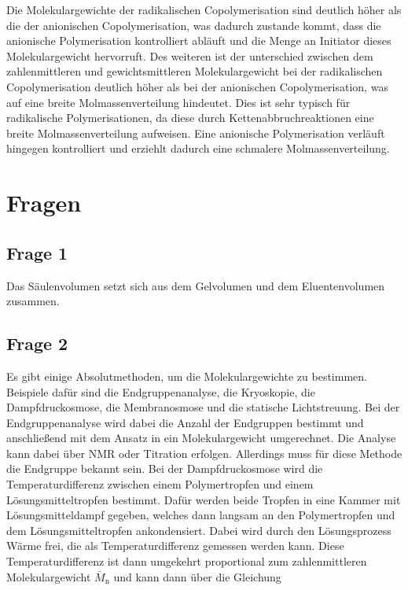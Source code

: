 \documentclass[10pt,a4paper,ngerman]{scrartcl}
\begin{document}
		Die Molekulargewichte der radikalischen Copolymerisation sind deutlich höher als die der anionischen Copolymerisation, was dadurch 
		zustande kommt, dass die anionische Polymerisation kontrolliert abläuft und die Menge an Initiator dieses Molekulargewicht hervorruft. 
		Des weiteren ist der unterschied zwischen dem zahlenmittleren und gewichtsmittleren Molekulargewicht bei der radikalischen 
		Copolymerisation deutlich höher als bei der anionischen Copolymerisation, was auf eine breite Molmassenverteilung hindeutet. Dies ist sehr 
		typisch für radikalische Polymerisationen, da diese durch Kettenabbruchreaktionen eine breite Molmassenverteilung aufweisen. Eine anionische 
		Polymerisation verläuft hingegen kontrolliert und erziehlt dadurch eine schmalere Molmassenverteilung. 

\section{Fragen}

	\subsection{Frage 1}

		Das Säulenvolumen setzt sich aus dem Gelvolumen und dem Eluentenvolumen zusammen. \cite{polyskript}

	\subsection{Frage 2}

		Es gibt einige Absolutmethoden, um die Molekulargewichte zu bestimmen. Beispiele dafür sind die Endgruppenanalyse, die Kryoskopie, 
		die Dampfdruckosmose, die Membranosmose und die statische Lichtstreuung. Bei der Endgruppenanalyse wird dabei die Anzahl der Endgruppen 
		bestimmt und anschließend mit dem Ansatz in ein Molekulargewicht umgerechnet. Die Analyse kann dabei über NMR oder Titration erfolgen. 
		Allerdings muss für diese Methode die Endgruppe bekannt sein. Bei der Dampfdruckosmose wird die Temperaturdifferenz zwischen einem 
		Polymertropfen und einem Lösungsmitteltropfen bestimmt. Dafür werden beide Tropfen in eine Kammer mit Lösungsmitteldampf gegeben, welches 
		dann langsam an den Polymertropfen und dem Lösungsmitteltropfen ankondensiert. Dabei wird durch den Lösungsprozess Wärme frei, die 
		als Temperaturdifferenz gemessen werden kann. Diese Temperaturdifferenz ist dann umgekehrt proportional zum zahlenmittleren 
		Molekulargewicht $\bar{M}_\text{n}$ und kann dann über die Gleichung 
\end{document}
